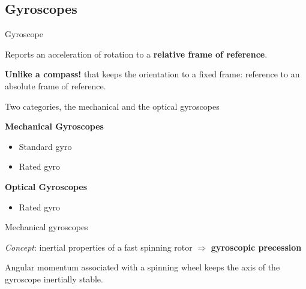 \documentclass[compress]{beamer}
\begin{document}
\subsection{Gyroscopes}

\begin{frame}{Gyroscope}

    Reports an acceleration of rotation to a \textbf{relative frame of reference}.

    \textbf{Unlike a compass!} that keeps the orientation to a fixed frame: reference to an
    absolute frame of reference.

    \pause

    Two categories, the mechanical and the optical gyroscopes

    {\bf Mechanical Gyroscopes}

    \begin{itemize}
        \item Standard gyro
        \item Rated gyro
    \end{itemize}

    {\bf Optical Gyroscopes}

    \begin{itemize}
        \item Rated gyro
    \end{itemize}

\end{frame}

\begin{frame}{Mechanical gyroscopes}

    \begin{multicols}{2}
    \emph{Concept}: inertial properties of a fast spinning rotor $\Rightarrow$ \textbf{gyroscopic precession}

    Angular momentum associated with a spinning wheel keeps the axis of the
    gyroscope inertially stable.
        \vfill
        \columnbreak
    \end{multicols}



\end{frame}
\end{document}
